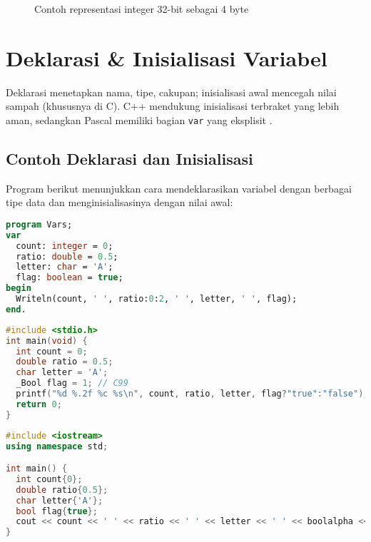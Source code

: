 \documentclass[../main.tex]{subfiles}
\begin{document}
\begin{figure}[H]
  \centering
  \caption{Contoh representasi integer 32-bit sebagai 4 byte}
\end{figure}

\section{Deklarasi \& Inisialisasi Variabel}
Deklarasi menetapkan nama, tipe, cakupan; inisialisasi awal mencegah nilai sampah (khususnya di C). C++ mendukung inisialisasi terbraket yang lebih aman, sedangkan Pascal memiliki bagian \texttt{var} yang eksplisit \parencite{pascal-tutorial-wikibooks,gnu-c-manual,cpp-reference}.

\subsection{Contoh Deklarasi dan Inisialisasi}

Program berikut menunjukkan cara mendeklarasikan variabel dengan berbagai tipe data dan menginisialisasinya dengan nilai awal:

\begin{lstlisting}[language=Pascal, caption={Deklarasi dan inisialisasi di Pascal}]
program Vars;
var
  count: integer = 0;
  ratio: double = 0.5;
  letter: char = 'A';
  flag: boolean = true;
begin
  Writeln(count, ' ', ratio:0:2, ' ', letter, ' ', flag);
end.
\end{lstlisting}

\begin{lstlisting}[language=C, caption={Deklarasi dan inisialisasi di C}]
#include <stdio.h>
int main(void) {
  int count = 0;
  double ratio = 0.5;
  char letter = 'A';
  _Bool flag = 1; // C99
  printf("%d %.2f %c %s\n", count, ratio, letter, flag?"true":"false");
  return 0;
}
\end{lstlisting}

\begin{lstlisting}[language=C++, caption={Deklarasi dan inisialisasi di C++}]
#include <iostream>
using namespace std;

int main() {
  int count{0};
  double ratio{0.5};
  char letter{'A'};
  bool flag{true};
  cout << count << ' ' << ratio << ' ' << letter << ' ' << boolalpha << flag << '\n';
}
\end{lstlisting}
\end{document}
